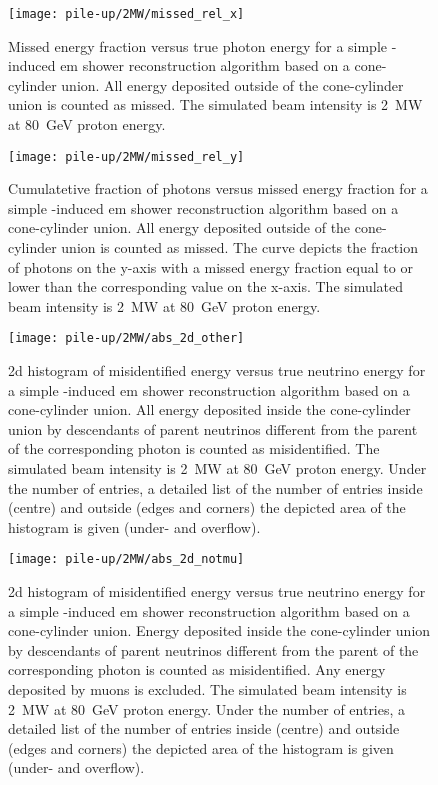 \begin{figure}[htb]
	\centering
	\texttt{[image: pile-up/2MW/missed\_rel\_x]}
	\caption{Missed energy fraction versus true photon energy for a simple \Pgpz-induced \gls{em} shower reconstruction algorithm based on a cone-cylinder union.
		All energy deposited outside of the cone-cylinder union is counted as missed.
		The simulated beam intensity is \SI{2}{\mega\watt} at \SI{80}{\giga\electronvolt} proton energy.}
\end{figure}

\begin{figure}[htb]
	\centering
	\texttt{[image: pile-up/2MW/missed\_rel\_y]}
	\caption{Cumulatetive fraction of photons versus missed energy fraction for a simple \Pgpz-induced \gls{em} shower reconstruction algorithm based on a cone-cylinder union.
		All energy deposited outside of the cone-cylinder union is counted as missed.
		The curve depicts the fraction of photons on the y-axis with a missed energy fraction equal to or lower than the corresponding value on the x-axis.
		The simulated beam intensity is \SI{2}{\mega\watt} at \SI{80}{\giga\electronvolt} proton energy.}
\end{figure}

\begin{figure}[htb]
	\centering
	\texttt{[image: pile-up/2MW/abs\_2d\_other]}
	\caption{\gls{2d} histogram of misidentified energy versus true neutrino energy for a simple \Pgpz-induced \gls{em} shower reconstruction algorithm based on a cone-cylinder union.
		All energy deposited inside the cone-cylinder union by descendants of parent neutrinos different from the parent of the corresponding \Pgpz photon is counted as misidentified.
		The simulated beam intensity is \SI{2}{\mega\watt} at \SI{80}{\giga\electronvolt} proton energy.
		Under the number of entries, a detailed list of the number of entries inside (centre) and outside (edges and corners) the depicted area of the histogram is given (under- and overflow).}
\end{figure}

\begin{figure}[htb]
	\centering
	\texttt{[image: pile-up/2MW/abs\_2d\_notmu]}
	\caption{\gls{2d} histogram of misidentified energy versus true neutrino energy for a simple \Pgpz-induced \gls{em} shower reconstruction algorithm based on a cone-cylinder union.
		Energy deposited inside the cone-cylinder union by descendants of parent neutrinos different from the parent of the corresponding \Pgpz photon is counted as misidentified.
		Any energy deposited by muons is excluded.
		The simulated beam intensity is \SI{2}{\mega\watt} at \SI{80}{\giga\electronvolt} proton energy.
		Under the number of entries, a detailed list of the number of entries inside (centre) and outside (edges and corners) the depicted area of the histogram is given (under- and overflow).}
\end{figure}

